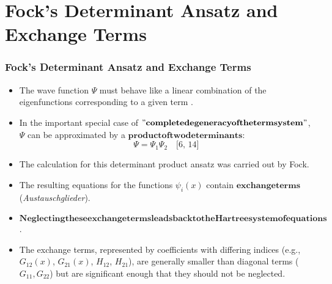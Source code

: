 \section{Fock's Determinant Ansatz and Exchange Terms}
\begin{frame}
    \frametitle{Fock's Determinant Ansatz and Exchange Terms}
    \begin{itemize}
        \item The wave function $\Psi$ must behave like a linear combination of the eigenfunctions corresponding to a given term .
        \item In the important special case of $\mathbf{"complete degeneracy of the term system"}$, $\Psi$ can be approximated by a $\mathbf{product of two determinants}$:
        $$\Psi = \Psi_1 \Psi_2 \quad \text{[6, 14]}$$
        \item The calculation for this determinant product ansatz was carried out by Fock.
        \item The resulting equations for the functions $\psi_i(x)$ contain $\mathbf{exchange terms}$ (\textit{Austauschglieder}).
        \item $\mathbf{Neglecting these exchange terms leads back to the Hartree system of equations}$.
        \item The exchange terms, represented by coefficients with differing indices (e.g., $G_{12}(x)$, $G_{21}(x)$, $H_{12}$, $H_{21}$), are generally smaller than diagonal terms ($G_{11}, G_{22}$) but are significant enough that they should not be neglected.
    \end{itemize}
\end{frame}

